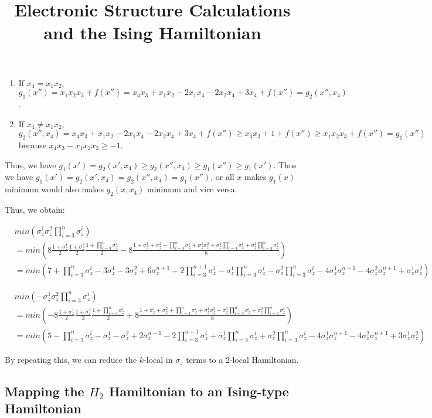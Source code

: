 \documentclass{article}
\newcommand\z[1]{\sigma_z^{#1}}\title{Electronic Structure Calculations and the Ising Hamiltonian}
\begin{document}
\begin{enumerate}
\item If $x_4=x_1x_2$, $g_1(x'')=x_1x_2x_3+f(x'')=x_4x_3+x_1x_2-2x_1x_4-2x_2x_4+3x_4+f(x'')=g_2(x'',x_4)$.
\item If $x_4\neq x_1x_2$, $g_2(x'',x_4)=x_4x_3+x_1x_2-2x_1x_4-2x_2x_4+3x_4+f(x'')\geq x_4x_3+1+f(x'') \geq x_1x_2x_3+f(x'')=g_1(x'')$ because $x_4x_3-x_1x_2x_3\geq -1$.
\end{enumerate}

Thus, we have $g_1(x')=g_2(x',x_4)\geq g_2(x'',x_4)\geq g_1(x'')\geq g_1(x')$. Thus we have $g_1(x')=g_2(x',x_4)=g_2(x'',x_4)=g_1(x'')$, or all $x$ makes $g_1(x)$ minimum would also makes $g_2(x,x_4)$ minimum and vice versa.

Thus, we obtain:

\begin{equation}
\begin{aligned}
&min(\z{1}\z{2}\prod_{i=3}^n\z{i})\\
&=min(8\frac{1+\z{1}}{2}\frac{1+\z{2}}{2}\frac{1+\prod_{i=3}^n\z{i}}{2}-8\frac{1+\z{1}+\z{2}+\prod_{i=3}^n\z{i}+\z{1}\z{2}+\z{1}\prod_{i=3}^n\z{i}+\z{2}\prod_{i=3}^n\z{i}}{8})\\
&=min(7+\prod_{i=3}^n\z{i}-3\z{1}-3\z{2}+6\z{n+1}+2\prod_{i=3}^{n+1}\z{i}-\z{1}\prod_{i=3}^n\z{i}-\z{2}\prod_{i=3}^n\z{i}-4\z{1}\z{n+1}-4\z{2}\z{n+1}+\z{1}\z{2})
\end{aligned}
\end{equation}

\begin{equation}
\begin{aligned}
&min(-\z{1}\z{2}\prod_{i=3}^n\z{i})\\
&=min(-8\frac{1+\z{1}}{2}\frac{1+\z{2}}{2}\frac{1+\prod_{i=3}^n\z{i}}{2}+8\frac{1+\z{1}+\z{2}+\prod_{i=3}^n\z{i}+\z{1}\z{2}+\z{1}\prod_{i=3}^n\z{i}+\z{2}\prod_{i=3}^n\z{i}}{8})\\
&=min(5-\prod_{i=3}^n\z{i}-\z{1}-\z{2}+2\z{n+1}-2\prod_{i=3}^{n+1}\z{i}+\z{1}\prod_{i=3}^n\z{i}+\z{2}\prod_{i=3}^n\z{i}-4\z{1}\z{n+1}-4\z{2}\z{n+1}+3\z{1}\z{2})
\end{aligned}
\end{equation}

By repeating this, we can reduce the $k$-local in $\sigma_z$ terms to a 2-local Hamiltonian.

\subsection*{Mapping the $H_2$ Hamiltonian to an Ising-type Hamiltonian}
\end{document}
